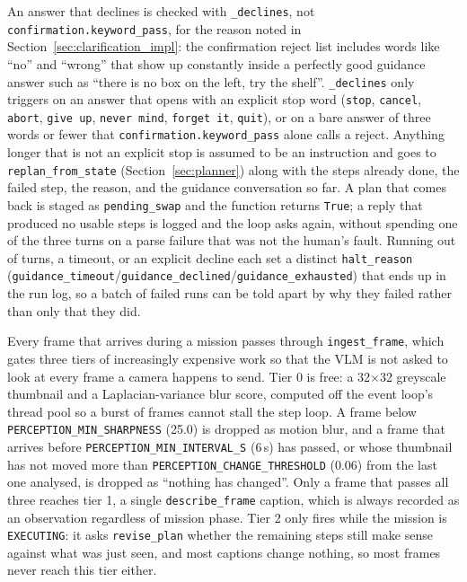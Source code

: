 An answer that declines is checked with \texttt{\_declines}, not
\texttt{confirmation.keyword\_pass}, for the reason noted in
Section~\ref{sec:clarification_impl}: the confirmation reject list includes
words like ``no'' and ``wrong'' that show up constantly inside a perfectly
good guidance answer such as ``there is no box on the left, try the shelf''.
\texttt{\_declines} only triggers on an answer that opens with an explicit
stop word (\texttt{stop}, \texttt{cancel}, \texttt{abort}, \texttt{give up},
\texttt{never mind}, \texttt{forget it}, \texttt{quit}), or on a bare answer
of three words or fewer that \texttt{confirmation.keyword\_pass} alone calls a
reject. Anything longer that is not an explicit stop is assumed to be an
instruction and goes to \texttt{replan\_from\_state}
(Section~\ref{sec:planner}) along with the steps already done, the failed
step, the reason, and the guidance conversation so far. A plan that comes
back is staged as \texttt{pending\_swap} and the function returns \texttt{True};
a reply that produced no usable steps is logged and the loop asks again,
without spending one of the three turns on a parse failure that was not the
human's fault. Running out of turns, a timeout, or an explicit decline each
set a distinct \texttt{halt\_reason}
(\texttt{guidance\_timeout}/\texttt{guidance\_declined}/\texttt{guidance\_exhausted})
that ends up in the run log, so a batch of failed runs can be told apart by
why they failed rather than only that they did.

\label{ssec:revision_impl}

Every frame that arrives during a mission passes through \texttt{ingest\_frame},
which gates three tiers of increasingly expensive work so that the VLM is
not asked to look at every frame a camera happens to send. Tier 0 is free: a
32$\times$32 greyscale thumbnail and a Laplacian-variance blur score, computed
off the event loop's thread pool so a burst of frames cannot stall the step
loop. A frame below \texttt{PERCEPTION\_MIN\_SHARPNESS} (25.0) is dropped as
motion blur, and a frame that arrives before
\texttt{PERCEPTION\_MIN\_INTERVAL\_S} (6\,s) has passed, or whose thumbnail has
not moved more than \texttt{PERCEPTION\_CHANGE\_THRESHOLD} (0.06) from the last
one analysed, is dropped as ``nothing has changed''. Only a frame that passes
all three reaches tier 1, a single \texttt{describe\_frame} caption, which is
always recorded as an observation regardless of mission phase. Tier 2 only
fires while the mission is \texttt{EXECUTING}: it asks \texttt{revise\_plan}
whether the remaining steps still make sense against what was just seen, and
most captions change nothing, so most frames never reach this tier either.

